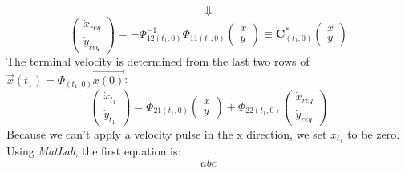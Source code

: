 \documentclass[11pt, a4paper]{article}
\begin{document}
\begin{equation*}
    \Downarrow
\end{equation*}
\begin{equation}
    \begin{pmatrix}
        \dot{x}_{req} \\
        \dot{y}_{req}
    \end{pmatrix} = -\Phi_{12(t_1,0)}^{-1}\Phi_{11(t_1,0)}\begin{pmatrix}
        x\\y
    \end{pmatrix} \equiv \mathbf{C}^*_{(t_1,0)} \begin{pmatrix}
        x\\y
    \end{pmatrix}
\end{equation}
The terminal velocity is determined from the last two rows of $\vec{x}(t_1)=\Phi_(t_1,0)\vec{x(0)}$:
\begin{equation}
    \begin{pmatrix}
        \dot{x}_{t_1}\\\dot{y}_{t_1}
    \end{pmatrix} = \Phi_{21(t_1,0)}\begin{pmatrix}
        x\\y
    \end{pmatrix} + \Phi_{22(t_1,0)}\begin{pmatrix}
        \dot{x}_{req} \\
        \dot{y}_{req}
    \end{pmatrix}
\end{equation}
Because we can't apply a velocity pulse in the x direction, we set $\dot{x}_{t_1}$ to be zero. Using \emph{MatLab}, the first equation is:
\begin{equation}
    abc
\end{equation}
\end{document}
